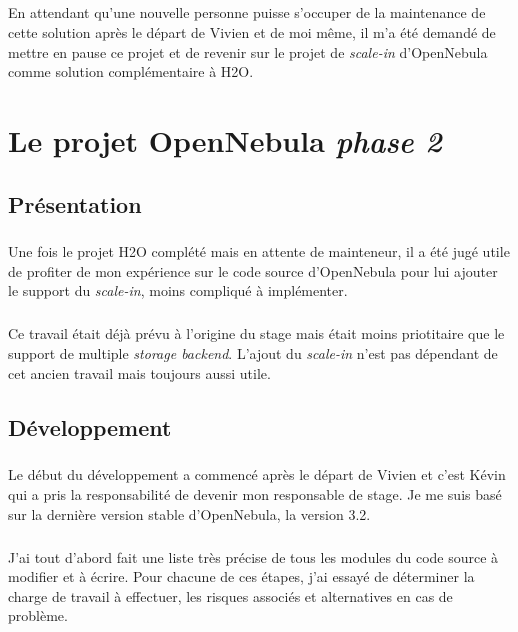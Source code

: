 \paragraph*{}
En attendant qu'une nouvelle personne puisse s'occuper de la maintenance de cette solution après le départ de Vivien et de moi même, il m'a été demandé de mettre en pause ce projet
et de revenir sur le projet de \emph{scale-in} d'OpenNebula comme solution complémentaire à H2O.


\chapter{Le projet OpenNebula \emph{phase 2}}

\section{Présentation}
\paragraph*{}
Une fois le projet H2O complété mais en attente de mainteneur, il a été jugé utile de profiter de mon expérience sur le code source d'OpenNebula pour lui ajouter
le support du \emph{scale-in}, moins compliqué à implémenter.

\paragraph*{}
Ce travail était déjà prévu à l'origine du stage mais était moins priotitaire que le support de multiple \emph{storage backend}.
L'ajout du \emph{scale-in} n'est pas dépendant de cet ancien travail mais toujours aussi utile.\\

\section{Développement}
\paragraph*{}
Le début du développement a commencé après le départ de Vivien et c'est Kévin qui a pris la responsabilité de devenir mon responsable de stage.
Je me suis basé sur la dernière version stable d'OpenNebula, la version 3.2.

\paragraph*{}
J'ai tout d'abord fait une liste très précise de tous les modules du code source à modifier et à écrire. Pour chacune de ces étapes, j'ai essayé de déterminer
la charge de travail à effectuer, les risques associés et alternatives en cas de problème.

